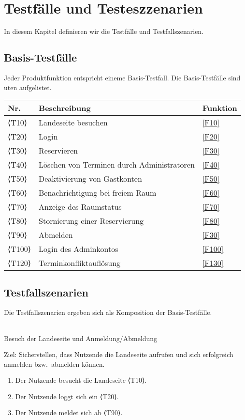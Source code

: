 \chapter{Testfälle und Testeszzenarien}
\label{chap:test}
In diesem Kapitel definieren wir die Testfälle und Testfallszenarien.

\section{Basis-Testfälle}

Jeder Produktfunktion entspricht eineme Basis-Testfall. Die Basis-Testfälle sind uten aufgelistet.


\begin{table}[htbp]


  \centering
  \begin{tabularx}{\textwidth}{ l|X|l }
      \textbf{Nr.} & \textbf{Beschreibung} & \textbf{Funktion} \\ \hline\hline
      ⟨T10⟩ & Landeseite besuchen &\ref{F10}\\
      ⟨T20⟩ & Login &\ref{F20} \\
      ⟨T30⟩ & Reservieren &\ref{F30} \\
      ⟨T40⟩ & Löschen von Terminen durch Administratoren &\ref{F40} \\
      ⟨T50⟩ & Deaktivierung von Gastkonten &\ref{F50} \\
      ⟨T60⟩ & Benachrichtigung bei freiem Raum &\ref{F60} \\
      ⟨T70⟩ & Anzeige des Raumstatus &\ref{F70} \\
      ⟨T80⟩ & Stornierung einer Reservierung &\ref{F80} \\
      ⟨T90⟩ & Abmelden &\ref{F30} \\
      ⟨T100⟩& Login des Adminkontos &\ref{F100} \\
      ⟨T120⟩ & Terminkonfliktauflösung &\ref{F130} \\
  \end{tabularx}\label{tab:test_table}
\end{table}

\section{Testfallszenarien}
Die Testfallszenarien ergeben sich als Komposition der Basis-Testfälle.\\ \\
\begin{scenario}{10}{Besuch der Landeseite und Anmeldung/Abmeldung}
  \item[Ziel:] Sicherstellen, dass Nutzende die Landeseite aufrufen und sich erfolgreich anmelden bzw.\ abmelden können.
  \begin{enumerate}
    \item Der Nutzende besucht die Landeseite ⟨T10⟩.
    \item Der Nutzende loggt sich ein ⟨T20⟩.
    \item Der Nutzende meldet sich ab ⟨T90⟩.
  \end{enumerate}
\end{scenario}

